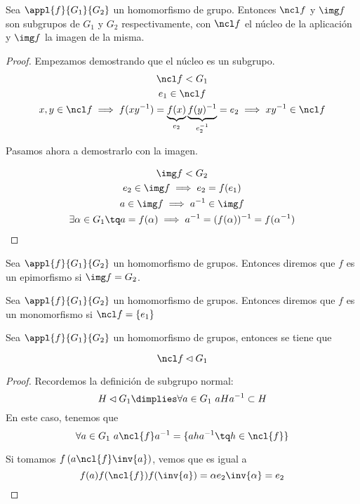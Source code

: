 \documentclass[nochap]{apuntes}
\begin{document}
\begin{theorem}
 Sea $\appl{f}{G_1}{G_2}$ un homomorfismo de grupo. Entonces $\ncl f$ y $\img f$ son subgrupos de $G_1$ y $G_2$ respectivamente, con $\ncl f$ el núcleo de la aplicación y $\img f$ la imagen de la misma.
 \end{theorem}

 \begin{proof} Empezamos demostrando que el núcleo es un subgrupo.
 \begin{gather*}
  \ncl f < G_1 \\
 e_1 \in \ncl f \\
 x, y \in \ncl f \implies f(xy^{-1}) = \underbrace{f(x)}_{e_2} \underbrace{f(y)^{-1}}_{e_2^{-1}} = e_2 \implies xy^{-1}\in \ncl f \\
 \end{gather*}

Pasamos ahora a demostrarlo con la imagen.

\begin{gather*}
\img f < G_2 \\
 e_2\in \img f \implies e_2 = f(e_1)\\
 a\in \img f \implies a^{-1}\in \img f\\
 \exists \alpha \in G_1 \tq a=f(\alpha ) \implies a^{-1} = (f(\alpha ))^{-1} = f(\alpha ^{-1})
 \end{gather*}

 \end{proof}

\begin{defn}[Epimorfismo]
Sea $\appl{f}{G_1}{G_2}$ un homomorfismo de grupos. Entonces diremos que $f$ es un epimorfismo si $\img f = G_2$.
\end{defn}

\begin{defn}[Monomorfismo]
Sea $\appl{f}{G_1}{G_2}$ un homomorfismo de grupos. Entonces diremos que $f$ es un monomorfismo si $\ncl f = \{ e_1\} $
\end{defn}

\begin{lemma} Sea $\appl{f}{G_1}{G_2}$ un homomorfismo de grupos, entonces se tiene que

\[ \ncl f \lhd G_1 \]
\end{lemma}

\begin{proof} Recordemos la definición de subgrupo normal:
\[ H \lhd G_1 \dimplies \forall a\in G_1\ aHa^{-1}\subset H \]
En este caso, tenemos que
\[ \forall a\in G_1\ a\ncl{f}a^{-1} = \{aha^{-1} \tq h\in \ncl{f} \} \]

Si tomamos $f\left(a\ncl{f}\inv{a}\right)$, vemos que es igual a \[ f(a) f(\ncl{f}) f(\inv{a}) = \alpha e_2 \inv{\alpha} = e_2 \]
\end{proof}
\end{document}
